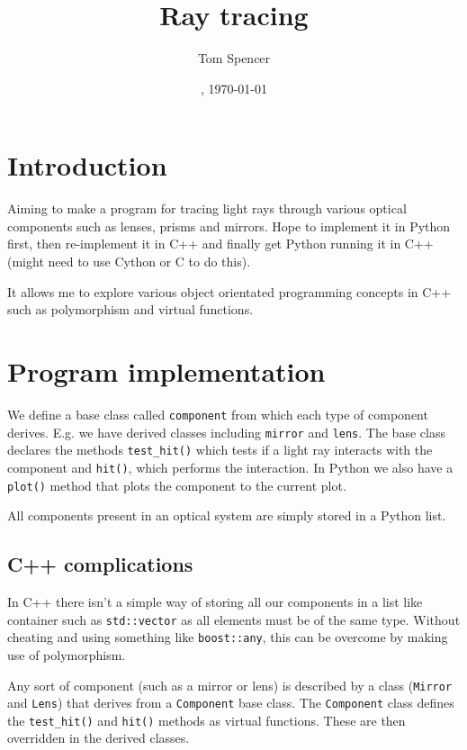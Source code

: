 \documentclass{article}
\title{Ray tracing}
\author{Tom Spencer}
\date{\currenttime, \today}
\begin{document}

\maketitle

\section{Introduction}
Aiming to make a program for tracing light rays through various optical components such as lenses, prisms and mirrors. Hope to implement it in Python first, then re-implement it in C++ and finally get Python running it in C++ (might need to use Cython or C to do this).

It allows me to explore various object orientated programming concepts in C++ such as polymorphism and virtual functions.

\section{Program implementation}
We define a base class called \texttt{component} from which each type of component derives. E.g. we have derived classes including \texttt{mirror} and \texttt{lens}. The base class declares the methods \texttt{test\_hit()} which tests if a light ray interacts with the component and \texttt{hit()}, which performs the interaction. In Python we also have a \texttt{plot()} method that plots the component to the current plot.

All components present in an optical system are simply stored in a Python list.

\subsection{C++ complications}
In C++ there isn't a simple way of storing all our components in a list like container such as \texttt{std::vector} as all elements must be of the same type. Without cheating and using something like \texttt{boost::any}, this can be overcome by making use of polymorphism.

Any sort of component (such as a mirror or lens) is described by a class (\texttt{Mirror} and \texttt{Lens}) that derives from a \texttt{Component} base class. The \texttt{Component} class defines the \texttt{test\_hit()} and \texttt{hit()} methods as virtual functions. These are then overridden in the derived classes.
\end{document}
